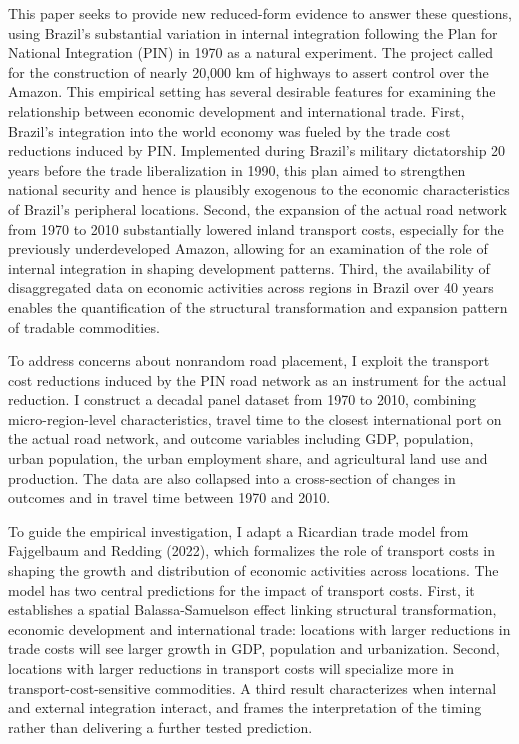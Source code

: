 \documentclass[11pt]{article}
\begin{document}
This paper seeks to provide new reduced-form evidence to answer these questions, using Brazil's substantial variation in internal integration following the Plan for National Integration (PIN) in 1970 as a natural experiment. The project called for the construction of nearly 20,000 km of highways to assert control over the Amazon. This empirical setting has several desirable features for examining the relationship between economic development and international trade. First, Brazil's integration into the world economy was fueled by the trade cost reductions induced by PIN. Implemented during Brazil's military dictatorship 20 years before the trade liberalization in 1990, this plan aimed to strengthen national security and hence is plausibly exogenous to the economic characteristics of Brazil's peripheral locations. Second, the expansion of the actual road network from 1970 to 2010 substantially lowered inland transport costs, especially for the previously underdeveloped Amazon, allowing for an examination of the role of internal integration in shaping development patterns. Third, the availability of disaggregated data on economic activities across regions in Brazil over 40 years enables the quantification of the structural transformation and expansion pattern of tradable commodities.

To address concerns about nonrandom road placement, I exploit the transport cost reductions induced by the PIN road network as an instrument for the actual reduction. I construct a decadal panel dataset from 1970 to 2010, combining micro-region-level characteristics, travel time to the closest international port on the actual road network, and outcome variables including GDP, population, urban population, the urban employment share, and agricultural land use and production. The data are also collapsed into a cross-section of changes in outcomes and in travel time between 1970 and 2010.

To guide the empirical investigation, I adapt a Ricardian trade model from Fajgelbaum and Redding (2022), which formalizes the role of transport costs in shaping the growth and distribution of economic activities across locations. The model has two central predictions for the impact of transport costs. First, it establishes a spatial Balassa-Samuelson effect linking structural transformation, economic development and international trade: locations with larger reductions in trade costs will see larger growth in GDP, population and urbanization. Second, locations with larger reductions in transport costs will specialize more in transport-cost-sensitive commodities. A third result characterizes when internal and external integration interact, and frames the interpretation of the timing rather than delivering a further tested prediction.
\end{document}
